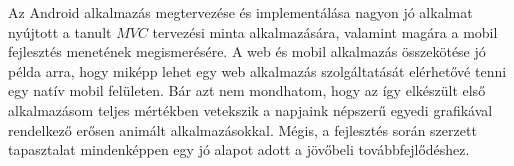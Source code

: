 \documentclass[12pt]{report}
\newtheorem{tét}{Tétel}[chapter]
\newtheorem{defi}[tét]{Definíció}
\newtheorem{áll}[tét]{Állítás}
\theoremstyle{definition}
\begin{document}
	Az Android alkalmazás megtervezése és implementálása nagyon jó alkalmat nyújtott a tanult $MVC$ tervezési minta alkalmazására, valamint magára a mobil fejlesztés menetének megismerésére. A web és mobil alkalmazás összekötése jó példa arra, hogy miképp lehet egy web alkalmazás szolgáltatását elérhetővé tenni egy natív mobil felületen. Bár azt nem mondhatom, hogy az így elkészült első alkalmazásom teljes mértékben vetekszik a napjaink népszerű egyedi grafikával rendelkező erősen animált alkalmazásokkal. Mégis, a fejlesztés során szerzett tapasztalat mindenképpen egy jó alapot adott a jövőbeli továbbfejlődéshez. 
	
	
	
	
	
\end{document}
